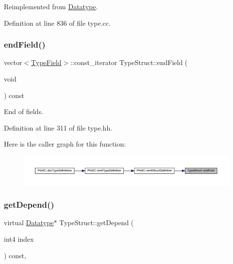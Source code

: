Reimplemented from \mbox{\hyperlink{class_datatype_ab26e4ca2c3091d3c5a34b4fbd7be76ae}{Datatype}}.



Definition at line 836 of file type.\+cc.

\mbox{\label{class_type_struct_a13a3ae8010726876454984d8f1fccfc8}} 
\subsubsection{\texorpdfstring{endField()}{endField()}}
{\footnotesize\ttfamily vector$<$\mbox{\hyperlink{struct_type_field}{Type\+Field}}$>$\+::const\+\_\+iterator Type\+Struct\+::end\+Field (\begin{DoxyParamCaption}\item[{void}]{ }\end{DoxyParamCaption}) const\hspace{0.3cm}{\ttfamily [inline]}}



End of fields. 



Definition at line 311 of file type.\+hh.

Here is the caller graph for this function\+:
\nopagebreak
\begin{figure}[H]
\begin{center}
\leavevmode
\includegraphics[width=350pt]{class_type_struct_a13a3ae8010726876454984d8f1fccfc8_icgraph}
\end{center}
\end{figure}
\mbox{\label{class_type_struct_ae60274464ed0003c0ee86f8bf3fa28c8}} 
\subsubsection{\texorpdfstring{getDepend()}{getDepend()}}
{\footnotesize\ttfamily virtual \mbox{\hyperlink{class_datatype}{Datatype}}$\ast$ Type\+Struct\+::get\+Depend (\begin{DoxyParamCaption}\item[{int4}]{index }\end{DoxyParamCaption}) const\hspace{0.3cm}{\ttfamily [inline]}, {\ttfamily [virtual]}}



